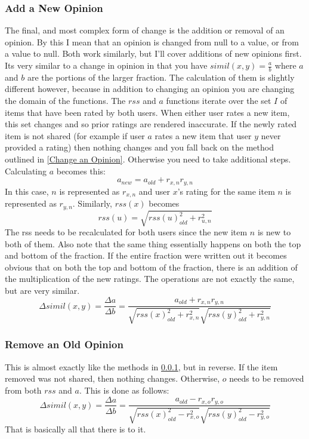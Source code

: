 \documentclass[12pt]{article}
\begin{document}
  \subsubsection{Add a New Opinion}
  \label{Add a New Opinion}
  \indent\indent The final, and most complex form of change is the addition or removal of an opinion.  By this I mean that an opinion is changed from null to a value, or from a value to null.  Both work similarly, but I'll cover additions of new opinions first.  Its very similar to a change in opinion in that you have $simil(x, y) = \frac{a}{b}$ where $a$ and $b$ are the portions of the larger fraction.  The calculation of them is slightly different however, because in addition to changing an opinion you are changing the domain of the functions.
  \p The $rss$ and $a$ functions iterate over the set $I$ of items that have been rated by both users.  When either user rates a new item, this set changes and so prior ratings are rendered inaccurate.   If the newly rated item is not shared (for example if user $a$ rates a new item that user $y$ never provided a rating) then nothing changes and you fall back on the method outlined in \ref{Change an Opinion}.  Otherwise you need to take additional steps.
  \p Calculating $a$ becomes this:
  \begin{displaymath}
    a_{new} = a_{old} + r_{x, n}r_{y, n}
  \end{displaymath}
  \p In this case, $n$ is represented as $r_{x, n}$ and user $x$'s rating for the same item $n$ is represented as $r_{y, n}$.  Similarly, $rss(x)$ becomes 
  \begin{displaymath}
    rss(u) = \sqrt{rss(u)_{old}^2+r_{u, n}^2}
  \end{displaymath}
  \p The rss needs to be recalculated for both users since the new item $n$ is new to both of them.  Also note that the same thing essentially happens on both the top and bottom of the fraction.  If the entire fraction were written out it becomes obvious that on both the top and bottom of the fraction, there is an addition of the multiplication of the new ratings.  The operations are not exactly the same, but are very similar.
  \begin{displaymath}
    \Delta simil(x, y) = \frac{\Delta a}{\Delta b} = \frac{a_{old} + r_{x, n}r_{y, n}}{\sqrt{rss(x)_{old}^2+r_{x, n}^2}\sqrt{rss(y)_{old}^2+r_{y, n}^2}}
  \end{displaymath}

  \subsubsection{Remove an Old Opinion}
  \indent\indent This is almost exactly like the methods in \ref{Add a New Opinion}, but in reverse.  If the item removed was not shared, then nothing changes.  Otherwise, $o$ needs to be removed from both $rss$ and $a$.  This is done as follows:
  \begin{displaymath}
    \Delta simil(x, y) = \frac{\Delta a}{\Delta b} = \frac{a_{old} - r_{x, o}r_{y, o}}{\sqrt{rss(x)_{old}^2-r_{x, o}^2}\sqrt{rss(y)_{old}^2-r_{y, o}^2}}
  \end{displaymath}
  That is basically all that there is to it.
\end{document}
